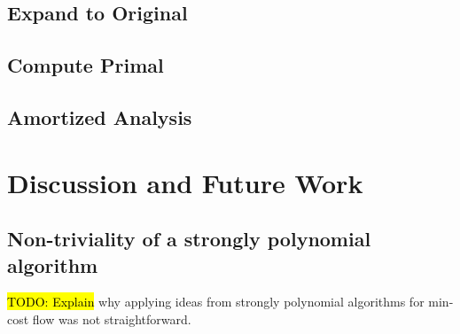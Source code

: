 \documentclass[11pt]{article}
\theoremstyle{definition}
\theoremstyle{definition}
\newcommand{\todo}[1]{\hl{TODO: #1}}
\begin{document}
	\subsection{Expand to Original}
	\subsection{Compute Primal}
	\subsection{Amortized Analysis}


\section{Discussion and Future Work}

	\subsection{Non-triviality of a strongly polynomial algorithm}

	\todo{Explain} why applying ideas from strongly polynomial algorithms for
	min-cost flow was not straightforward. 



\setlength{\bibitemsep}{0pt}
\nocite{*}
\printbibliography
\end{document}
